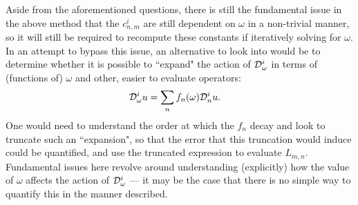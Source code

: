Aside from the aforementioned questions, there is still the fundamental issue in the above method that the $c_{n,m}^i$ are still dependent on $\omega$ in a non-trivial manner, so it will still be required to recompute these constants if iteratively solving for $\omega$.
In an attempt to bypass this issue, an alternative to look into would be to determine whether it is possible to ``expand" the action of $\mathcal{D}_{\omega}^i$ in terms of (functions of) $\omega$ and other, easier to evaluate operators:
\begin{align*}
	\mathcal{D}_{\omega}^i u &= \sum_n f_n(\omega)\mathcal{D}_n^i u.
\end{align*}
One would need to understand the order at which the $f_n$ decay and look to truncate such an ``expansion", so that the error that this truncation would induce could be quantified, and use the truncated expression to evaluate $L_{m,n}$.
Fundamental issues here revolve around understanding (explicitly) how the value of $\omega$ affects the action of $\mathcal{D}_\omega^i$ --- it may be the case that there is no simple way to quantify this in the manner described.